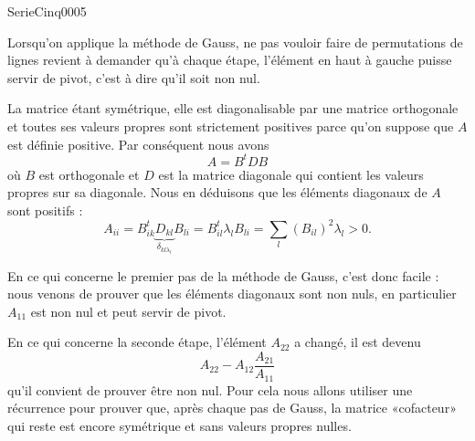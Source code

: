 
\begin{corrige}{SerieCinq0005}

	Lorsqu'on applique la méthode de Gauss, ne pas vouloir faire de permutations de lignes revient à demander qu'à chaque étape, l'élément en haut à gauche puisse servir de pivot, c'est à dire qu'il soit non nul.

	La matrice étant symétrique, elle est diagonalisable par une matrice orthogonale et toutes ses valeurs propres sont strictement positives parce qu'on suppose que $A$ est définie positive. Par conséquent nous avons
	\begin{equation}
		A=B^tDB
	\end{equation}
	où $B$ est orthogonale et $D$ est la matrice diagonale qui contient les valeurs propres sur sa diagonale. Nous en déduisons que les éléments diagonaux de $A$ sont positifs :
	\begin{equation}
		A_{ii}=B^t_{ik}\underbrace{D_{kl}}_{\delta_{kl\lambda_l}}B_{li}=B^t_{il}\lambda_lB_{li}=\sum_l(B_{il})^2\lambda_l>0.
	\end{equation}
	
	En ce qui concerne le premier pas de la méthode de Gauss, c'est donc facile : nous venons de prouver que les éléments diagonaux sont non nuls, en particulier $A_{11}$ est non nul et peut servir de pivot. 
	
	En ce qui concerne la seconde étape, l'élément $A_{22}$ a changé, il est devenu
	\begin{equation}	\label{EqCCnouvelhg}
		A_{22}-A_{12}\frac{ A_{21} }{ A_{11} }
	\end{equation}
	qu'il convient de prouver être non nul. Pour cela nous allons utiliser une récurrence pour prouver que, après chaque pas de Gauss, la matrice «cofacteur» qui reste est encore symétrique et sans valeurs propres nulles.


\end{corrige}
